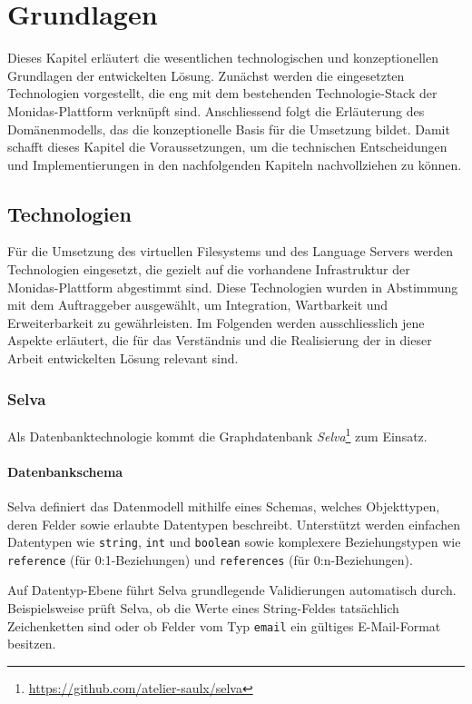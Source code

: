 \section{Grundlagen}
Dieses Kapitel erläutert die wesentlichen technologischen und konzeptionellen Grundlagen der entwickelten Lösung. Zunächst werden die eingesetzten Technologien vorgestellt, die eng mit dem bestehenden Technologie-Stack der Monidas-Plattform verknüpft sind. Anschliessend folgt die Erläuterung des Domänenmodells, das die konzeptionelle Basis für die Umsetzung bildet. Damit schafft dieses Kapitel die Voraussetzungen, um die technischen Entscheidungen und Implementierungen in den nachfolgenden Kapiteln nachvollziehen zu können.

\subsection{Technologien}
Für die Umsetzung des virtuellen Filesystems und des Language Servers werden Technologien eingesetzt, die gezielt auf die vorhandene Infrastruktur der Monidas-Plattform abgestimmt sind. Diese Technologien wurden in Abstimmung mit dem Auftraggeber ausgewählt, um Integration, Wartbarkeit und Erweiterbarkeit zu gewährleisten. Im Folgenden werden ausschliesslich jene Aspekte erläutert, die für das Verständnis und die Realisierung der in dieser Arbeit entwickelten Lösung relevant sind.


\subsubsection*{Selva}
Als Datenbanktechnologie kommt die Graphdatenbank \textit{Selva}\footnote{\url{https://github.com/atelier-saulx/selva}} zum Einsatz. 


\paragraph{Datenbankschema}
Selva definiert das Datenmodell mithilfe eines Schemas, welches Objekttypen, deren Felder sowie erlaubte Datentypen beschreibt. Unterstützt werden einfachen Datentypen wie \texttt{string}, \texttt{int} und \texttt{boolean} sowie komplexere Beziehungstypen wie \texttt{reference} (für 0:1-Beziehungen) und \texttt{references} (für 0:n-Beziehungen).

Auf Datentyp-Ebene führt Selva grundlegende Validierungen automatisch durch. Beispielsweise prüft Selva, ob die Werte eines String-Feldes tatsächlich Zeichenketten sind oder ob Felder vom Typ \texttt{email} ein gültiges E-Mail-Format besitzen.

